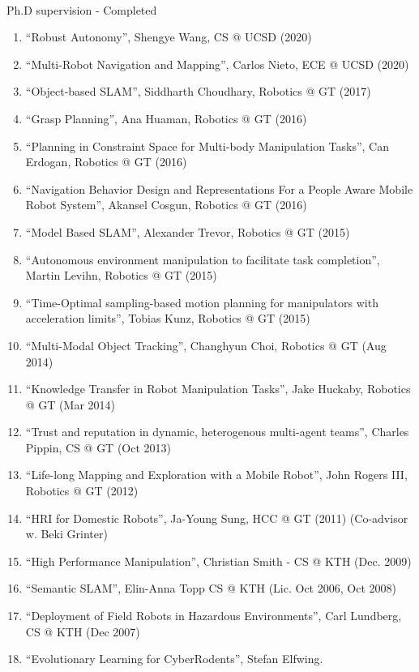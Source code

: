 \documentclass{article}
\begin{document}
\begin{cv}
\begin{cvlist}{~}
\item[Ph.D supervision - Completed]\ \\
  \begin{enumerate}
  \item ``Robust Autonomy'', Shengye Wang, CS @ UCSD (2020)
  \item ``Multi-Robot Navigation and Mapping'', Carlos Nieto, ECE @
    UCSD (2020)
  \item ``Object-based SLAM'', Siddharth Choudhary, Robotics @ GT (2017)
  \item ``Grasp Planning'', Ana Huaman, Robotics @ GT (2016)
  \item ``Planning in Constraint Space for Multi-body Manipulation
    Tasks'', Can Erdogan, Robotics @ GT (2016)
  \item ``Navigation Behavior Design and Representations For a People
    Aware Mobile Robot System'', Akansel Cosgun, Robotics @ GT (2016)
  \item ``Model Based SLAM'', Alexander Trevor, Robotics @ GT (2015)
  \item ``Autonomous environment manipulation to facilitate task
    completion'', Martin Levihn, Robotics @ GT (2015)
  \item ``Time-Optimal sampling-based motion planning for manipulators
    with acceleration limits'', Tobias Kunz, Robotics @ GT (2015)
  \item ``Multi-Modal Object Tracking'', Changhyun Choi, Robotics @ GT
    (Aug 2014)
  \item ``Knowledge Transfer in Robot Manipulation Tasks'', Jake
    Huckaby, Robotics @ GT (Mar 2014)
  \item ``Trust and reputation in dynamic, heterogenous multi-agent
    teams'', Charles Pippin, CS @ GT (Oct 2013)
  \item ``Life-long Mapping and Exploration with a Mobile Robot'',
    John Rogers III, Robotics @ GT (2012)
  \item ``HRI for Domestic Robots'', Ja-Young Sung, HCC @ GT (2011)
    (Co-advisor w. Beki Grinter)
  \item ``High Performance Manipulation'', Christian Smith - CS @ KTH
    (Dec. 2009)
  \item ``Semantic SLAM'', Elin-Anna Topp CS @ KTH (Lic. Oct 2006, Oct
    2008)
  \item ``Deployment of Field Robots in Hazardous Environments'', Carl
    Lundberg, CS @ KTH (Dec 2007)
  \item ``Evolutionary Learning for CyberRodents'', Stefan Elfwing.

\end{enumerate}
\end{cvlist}
\end{cv}
\end{document}
